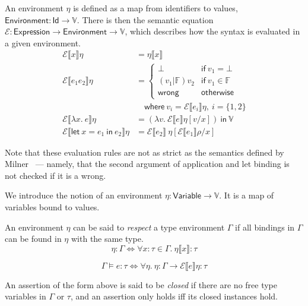 An environment $\eta$ is defined as a map from identifiers to values,
${\mathsf{Environment} : \mathsf{Id} \rightarrow \mathbb{V}}$.
There is then the semantic equation
${\mathcal{E} : \mathsf{Expression} \rightarrow \mathsf{Environment} \rightarrow
\mathbb{V}}$, which describes how the syntax is evaluated in a given
environment.
\begin{align*}
  \mathcal{E} \llbracket x \rrbracket \eta
  &= \eta \llbracket x \rrbracket \\
  \mathcal{E} \llbracket e_1 e_2 \rrbracket \eta
  &=
    \begin{cases}
      \bot & \mathsf{if} \ v_1 = \bot \\
      (v_1 | \mathbb{F}) v_2 & \mathsf{if} \ v_1 \in \mathbb{F} \\
      \mathsf{wrong} & \mathsf{otherwise}
    \end{cases}
  \\
  & \quad \textsf{where} \ v_i = \mathcal{E} \llbracket e_i \rrbracket \eta , \ i = \{
    1, 2\} \\
  \mathcal{E} \llbracket \lambda x . \ e \rrbracket \eta
  &=
    (\lambda v . \ \mathcal{E} \llbracket e \rrbracket \eta [v / x ])
    \ \mathsf{in} \ \mathbb{V} \\
  \mathcal{E} \llbracket \textsf{let} \ x = e_1 \ \textsf{in} \ e_2 \rrbracket \eta
  &=
    \mathcal{E} \llbracket e_2 \rrbracket \ \eta [ \mathcal{E} \llbracket e_1 \rrbracket\rho / x ]
\end{align*}

Note that these evaluation rules are not as strict as the semantics
defined by Milner~\cite{milner1978} --- namely, that the second argument
of application and let binding is not checked if it is a
\textsf{wrong}.

We introduce the notion of an environment $\eta : \mathsf{Variable} \rightarrow
\mathbb{V}$. It is a map of variables bound to values.

An environment $\eta$ can be said to \textit{respect} a type environment
$\Gamma$ if all bindings in $\Gamma$ can be found in $\eta$ with the same type.
\[\eta : \Gamma \iff \forall x : \tau \in \Gamma. \ \eta \llbracket x \rrbracket : \tau\]

\[
  \Gamma \vDash e : \tau \iff \forall \eta. \ \eta : \Gamma \rightarrow \mathcal{E} \llbracket e \rrbracket \eta : \tau
\]

An assertion of the form above is said to be \textit{closed} if there
are no free type variables in $\Gamma$ or $\tau$, and an assertion only holds
iff its closed instances hold.

